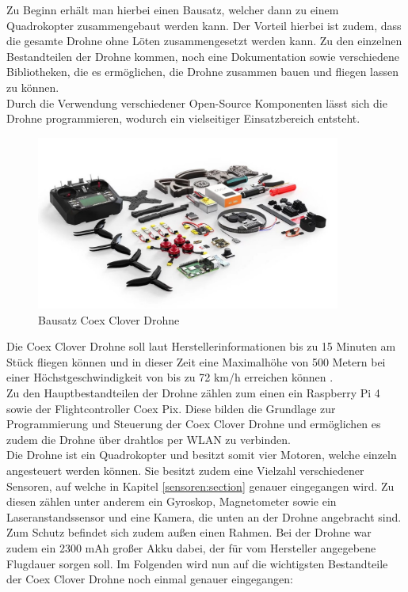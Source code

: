 Zu Beginn erhält man hierbei einen Bausatz, welcher dann zu einem Quadrokopter zusammengebaut werden kann. Der Vorteil hierbei ist zudem, dass die gesamte Drohne ohne Löten zusammengesetzt werden kann. Zu den einzelnen Bestandteilen der Drohne kommen, noch eine Dokumentation sowie verschiedene Bibliotheken, die es ermöglichen, die Drohne zusammen bauen und fliegen lassen zu können. \\
Durch die Verwendung verschiedener Open-Source Komponenten lässt sich die Drohne programmieren, wodurch ein vielseitiger Einsatzbereich entsteht.\\

\begin{figure}[htpb]
    \centering
    \includegraphics[width=10cm,keepaspectratio,angle=0]{images/coex_clover_kit.jpg}
    \caption[Bausatz Coex Clover Drohne]{\label{img coex_clover_kit} Bausatz Coex Clover Drohne \cite{img_coex_clover_kit}}
\end{figure}

Die Coex Clover Drohne soll laut Herstellerinformationen bis zu 15 Minuten am Stück fliegen können und in dieser Zeit eine Maximalhöhe von 500 Metern bei einer Höchstgeschwindigkeit von bis zu 72 km/h erreichen können \cite[vgl.][]{coex_clover}.\\

Zu den Hauptbestandteilen der Drohne zählen zum einen ein Raspberry Pi 4 sowie der Flightcontroller Coex Pix. Diese bilden die Grundlage zur Programmierung und Steuerung der Coex Clover Drohne und ermöglichen es zudem die Drohne über drahtlos per WLAN zu verbinden. \\
Die Drohne ist ein Quadrokopter und besitzt somit vier Motoren, welche einzeln angesteuert werden können. Sie besitzt zudem eine Vielzahl verschiedener Sensoren, auf welche in Kapitel \ref{sensoren:section} genauer eingegangen wird. Zu diesen zählen unter anderem ein Gyroskop, Magnetometer sowie ein Laseranstandssensor und eine Kamera, die unten an der Drohne angebracht sind.
Zum Schutz befindet sich zudem außen einen Rahmen.
Bei der Drohne war zudem ein 2300 mAh großer Akku dabei, der für vom Hersteller angegebene Flugdauer sorgen soll.
Im Folgenden wird nun auf die wichtigsten Bestandteile der Coex Clover Drohne noch einmal genauer eingegangen:

